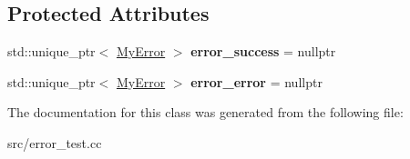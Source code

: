 \subsection*{Protected Attributes}
\begin{DoxyCompactItemize}
\item 
\hypertarget{class_error_test_a0f59553359b5a5fc50771e391478c1f4}{}\label{class_error_test_a0f59553359b5a5fc50771e391478c1f4} 
std\+::unique\+\_\+ptr$<$ \hyperlink{class_my_error}{My\+Error} $>$ {\bfseries error\+\_\+success} = nullptr
\item 
\hypertarget{class_error_test_a3f26eee630d733a24b1b192453abdc36}{}\label{class_error_test_a3f26eee630d733a24b1b192453abdc36} 
std\+::unique\+\_\+ptr$<$ \hyperlink{class_my_error}{My\+Error} $>$ {\bfseries error\+\_\+error} = nullptr
\end{DoxyCompactItemize}


The documentation for this class was generated from the following file\+:\begin{DoxyCompactItemize}
\item 
src/error\+\_\+test.\+cc\end{DoxyCompactItemize}

